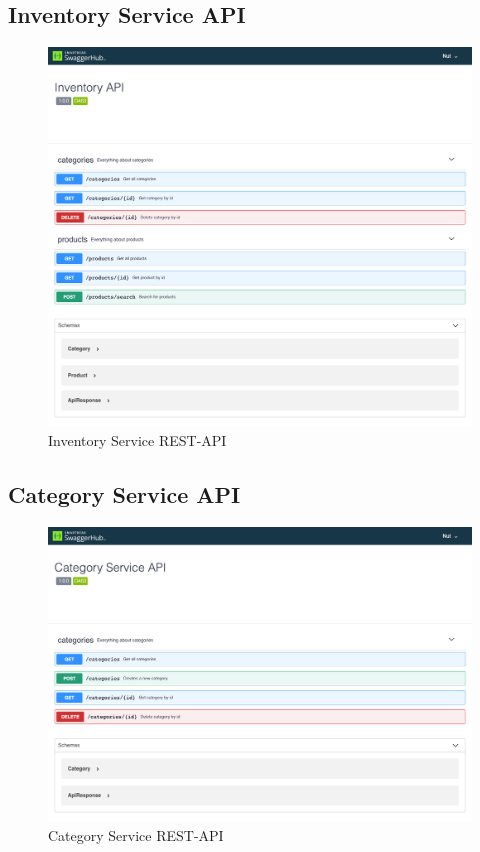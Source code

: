 \documentclass[12pt,a4paper]{article}
\begin{document}
	\subsection{Inventory Service API}
	\begin{figure}[H]
		\centering
		\includegraphics[scale=0.3]{img/swagger-inventory-service.png}
		\caption{Inventory Service REST-API}
	\end{figure}

	\subsection{Category Service API}
	\begin{figure}[H]
		\centering
		\includegraphics[scale=0.3]{img/swagger-category-service.png}
		\caption{Category Service REST-API}
	\end{figure}
\end{document}
